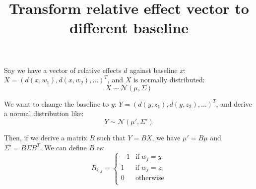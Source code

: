 \documentclass[a4paper]{article}
\title{Transform relative effect vector to different baseline}
\date{}
\begin{document}
\maketitle

Say we have a vector of relative effects $d$ against baseline $x$: $X = (d(x, w_1), d(x, w_2), \dots)^T$, and $X$ is normally distributed:
$$
X \sim \mathcal{N}(\mu, \Sigma)
$$

We want to change the baseline to $y$: $Y = (d(y, z_1), d(y, z_2), \dots)^T$, and derive a normal distribution like:
$$
Y \sim \mathcal{N}(\mu', \Sigma')
$$

Then, if we derive a matrix $B$ such that $Y = BX$, we have $\mu' = B\mu$ and $\Sigma' = B\Sigma B^T$. We can define $B$ as:
$$
B_{i,j} = \left\{
\begin{array}{ll}
-1 & \mathrm{if}\; w_j = y \\
1 & \mathrm{if}\; w_j = z_i \\
0 & \mathrm{otherwise}\\
\end{array}
\right.
$$
\end{document}
